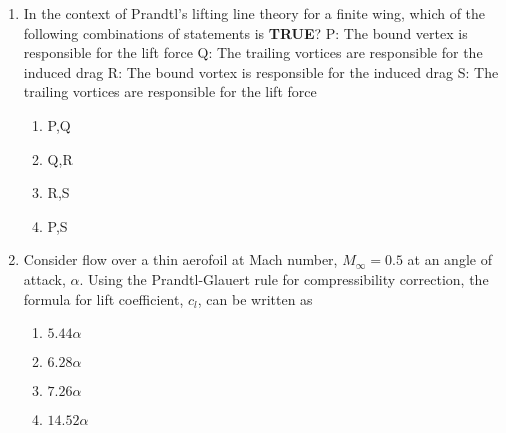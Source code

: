 \documentclass[journal]{IEEEtran}
\begin{document}
\begin{enumerate}
\begin{multicols}{2}
    \begin{enumerate}
        \item 7.53
        \item 2.59
        \item 2.91
        \item 0.39
    \end{enumerate}
\end{multicols}

\item In the context of Prandtl's lifting line theory for a finite wing, which of the following combinations of statements is \textbf{TRUE}?
P: The bound vertex is responsible for the lift force
Q: The trailing vortices are responsible for the induced drag
R: The bound vortex is responsible for the induced drag
S: The trailing vortices are responsible for the lift force
\begin{multicols}{2}
    \begin{enumerate}
        \item P,Q  
        \item Q,R
        \item R,S
        \item P,S
    \end{enumerate}
\end{multicols}

\item Consider flow over a thin aerofoil at Mach number, $M_{\infty} = 0.5$ at an angle of attack, $\alpha$. Using the Prandtl-Glauert rule for compressibility correction, the formula for lift coefficient, $c_l$, can be written as
\begin{multicols}{2}
    \begin{enumerate}
        \item $5.44 \alpha$
        \item $6.28\alpha$
        \item $7.26\alpha$
        \item $14.52 \alpha$
    \end{enumerate}
\end{multicols}


\end{enumerate}
\end{document}
